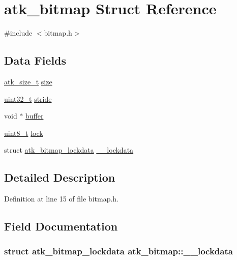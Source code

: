\hypertarget{structatk__bitmap}{\section{atk\+\_\+bitmap Struct Reference}
\label{structatk__bitmap}
}


{\ttfamily \#include $<$bitmap.\+h$>$}

\subsection*{Data Fields}
\begin{DoxyCompactItemize}
\item 
\hyperlink{atk_8h_a644f976397f323e48685f16b0c4fa802}{atk\+\_\+size\+\_\+t} \hyperlink{structatk__bitmap_afd44fc93403d7addaa5142944e3add03}{size}
\item 
\hyperlink{aplus_8h_a53a0df51603c77c2aa5b9ea61b606a82}{uint32\+\_\+t} \hyperlink{structatk__bitmap_a9716a316bc05bb6997a9da73ddb0ee3b}{stride}
\item 
void $\ast$ \hyperlink{structatk__bitmap_a3bed7ee0d49e89b2a1dd250ee2e58ab6}{buffer}
\item 
\hyperlink{aplus_8h_ae0430369c5a35dcdbc0bc19dcbb33a03}{uint8\+\_\+t} \hyperlink{structatk__bitmap_a045e533dfb5e23a575443d389f3dba95}{lock}
\item 
struct \hyperlink{structatk__bitmap__lockdata}{atk\+\_\+bitmap\+\_\+lockdata} \hyperlink{structatk__bitmap_a803fa3caa190331e1c3255d6ab19d91c}{\+\_\+\+\_\+lockdata}
\end{DoxyCompactItemize}


\subsection{Detailed Description}


Definition at line 15 of file bitmap.\+h.



\subsection{Field Documentation}
\hypertarget{structatk__bitmap_a803fa3caa190331e1c3255d6ab19d91c}{
\subsubsection[{\+\_\+\+\_\+lockdata}]{\setlength{\rightskip}{0pt plus 5cm}struct {\bf atk\+\_\+bitmap\+\_\+lockdata} atk\+\_\+bitmap\+::\+\_\+\+\_\+lockdata}}\label{structatk__bitmap_a803fa3caa190331e1c3255d6ab19d91c}


